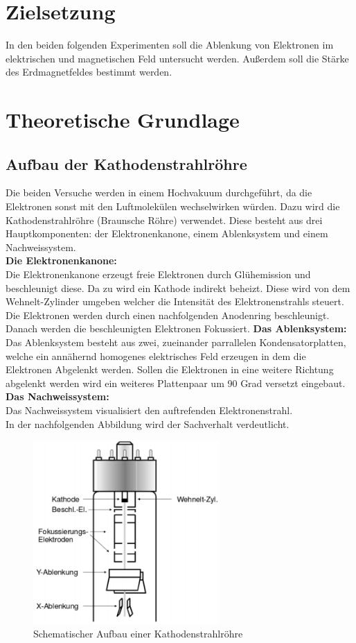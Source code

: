 \section{Zielsetzung}
In den beiden folgenden Experimenten soll die Ablenkung von Elektronen im elektrischen und magnetischen Feld untersucht werden. Außerdem soll die Stärke des Erdmagnetfeldes bestimmt werden.

\section{Theoretische Grundlage}
\label{sec:Theorie}
\subsection{Aufbau der Kathodenstrahlröhre}
Die beiden Versuche werden in einem Hochvakuum durchgeführt, da die Elektronen sonst mit den Luftmolekülen wechselwirken würden. Dazu wird die Kathodenstrahlröhre (Braunsche Röhre) verwendet. Diese besteht aus drei Hauptkomponenten: der Elektronenkanone, einem Ablenksystem und einem Nachweissystem.\\
\textbf{Die Elektronenkanone:} \\
Die Elektronenkanone erzeugt freie Elektronen durch Glühemission und beschleunigt diese. Da zu wird ein Kathode indirekt beheizt. Diese wird von dem Wehnelt-Zylinder umgeben welcher die Intensität des Elektronenstrahls steuert. Die Elektronen werden durch einen nachfolgenden Anodenring beschleunigt. Danach werden die beschleunigten Elektronen Fokussiert.
\textbf{Das Ablenksystem:} \\
Das Ablenksystem besteht aus zwei, zueinander parrallelen Kondensatorplatten, welche ein annähernd homogenes elektrisches Feld erzeugen in dem die Elektronen Abgelenkt werden. Sollen die Elektronen in eine weitere Richtung abgelenkt werden wird ein weiteres Plattenpaar um 90 Grad versetzt eingebaut.
\textbf{Das Nachweissystem:} \\
Das Nachweissystem visualisiert den auftrefenden Elektronenstrahl.\\
In der nachfolgenden Abbildung wird der Sachverhalt verdeutlicht.

\begin{figure}[H]
	\centering
	\includegraphics[height=7cm]{picture/Kathodenstrahlroehre.PNG}
	\caption{Schematischer Aufbau einer Kathodenstrahlröhre}
	\label{fig:Kathode}
\end{figure}

